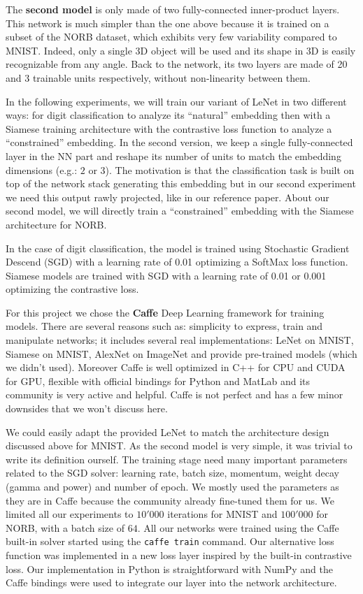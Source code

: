 \documentclass[a4paper,12pt]{report}
\newcommand{\eg}{e.g.}
\begin{document}
The {\bf second model} is only made of two fully-connected inner-product layers.
This network is much simpler than the one above because it is trained on a subset of the NORB dataset, which exhibits very few variability compared to MNIST.
Indeed, only a single 3D object will be used and its shape in 3D is easily recognizable from any angle.
Back to the network, its two layers are made of 20 and 3 trainable units respectively, without non-linearity between them. %

In the following experiments, we will train our variant of LeNet in two different ways: for digit classification to analyze its ``natural'' embedding then with a Siamese training architecture with the contrastive loss function to analyze a ``constrained'' embedding.
In the second version, we keep a single fully-connected layer in the NN part and reshape its number of units to match the embedding dimensions (\eg: $2$ or $3$).
The motivation is that the classification task is built on top of the network stack generating this embedding but in our second experiment we need this output rawly projected, like in our reference paper.
About our second model, we will directly train a ``constrained'' embedding with the Siamese architecture for NORB.

In the case of digit classification, the model is trained using Stochastic Gradient Descend (SGD) with a learning rate of 0.01 optimizing a SoftMax loss function.
Siamese models are trained with SGD with a learning rate of 0.01 or 0.001 optimizing the contrastive loss.

For this project we chose the {\bf Caffe} Deep Learning framework for training models.
There are several reasons such as: simplicity to express, train and manipulate networks; it includes several real implementations: LeNet on MNIST, Siamese on MNIST, AlexNet on ImageNet and provide pre-trained models (which we didn't used).
Moreover Caffe is well optimized in C++ for CPU and CUDA for GPU, flexible with official bindings for Python and MatLab and its community is very active and helpful.
Caffe is not perfect and has a few minor downsides that we won't discuss here.

We could easily adapt the provided LeNet to match the architecture design discussed above for MNIST.
As the second model is very simple, it was trivial to write its definition ourself.
The training stage need many important parameters related to the SGD solver: learning rate, batch size, momentum, weight decay (gamma and power) and number of epoch.
We mostly used the parameters as they are in Caffe because the community already fine-tuned them for us.
We limited all our experiments to $10'000$ iterations for MNIST and $100'000$ for NORB, with a batch size of $64$.
All our networks were trained using the Caffe built-in solver started using the {\tt caffe train} command.
Our alternative loss function was implemented in a new loss layer inspired by the built-in contrastive loss.
Our implementation in Python is straightforward with NumPy and the Caffe bindings were used to integrate our layer into the network architecture.
\end{document}
